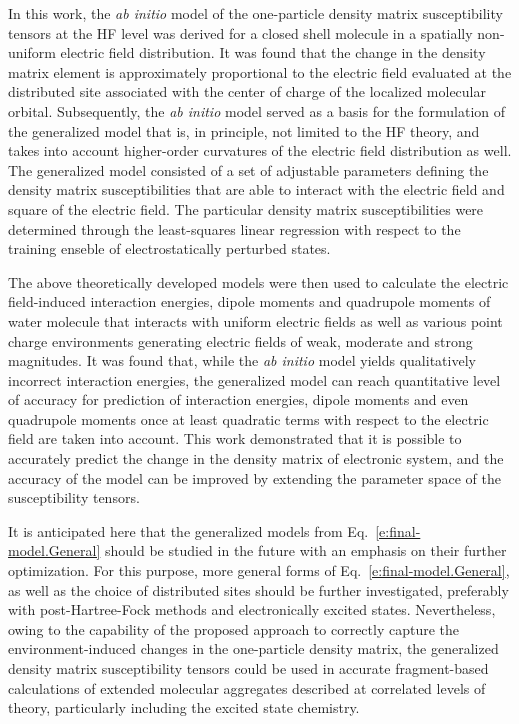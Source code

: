 \documentclass[aip,amsmath,amssymb,reprint,floatfix]{revtex4-1}
\begin{document}
In this work, the \emph{ab initio} model of the one\hyp{}particle density matrix susceptibility tensors
at the HF level was derived for a closed shell molecule in a spatially non\hyp{}uniform
electric field distribution. It was found that the change in the density matrix element
is approximately proportional to the electric field evaluated at the distributed site associated with the 
center of charge of the 
localized molecular orbital. Subsequently, the \emph{ab initio} model served as a basis
for the formulation of the generalized model that is, in principle, not limited to the HF theory,
and takes into account higher\hyp{}order curvatures of the electric field distribution as well.
The generalized model consisted of a set of adjustable parameters defining the density matrix susceptibilities
that are able to interact with the electric field and square of the electric field.
The particular density matrix susceptibilities were determined through the least\hyp{}squares 
linear regression with respect to the training enseble of electrostatically perturbed states.

The above theoretically developed models were then used to calculate the electric field\hyp{}induced
interaction energies, dipole moments and quadrupole moments of water molecule that
interacts with uniform electric fields as well as 
various point charge environments generating electric fields of weak, moderate
and strong magnitudes. It was found that, while the \emph{ab initio} model yields qualitatively incorrect
interaction energies, the generalized model can reach quantitative level of accuracy
for prediction of interaction energies, dipole moments and even quadrupole moments
once at least quadratic terms with respect to the electric field are taken into account. 
This work demonstrated that it is possible to
accurately predict the change in the density matrix of electronic system, and the accuracy of the model
can be improved by extending the parameter space of the susceptibility tensors. 

It is anticipated here that the generalized models from Eq.~\eqref{e:final-model.General}
should be studied in the future with an emphasis 
on their further optimization.
For this purpose, more general forms of Eq.~\eqref{e:final-model.General}, as well as the choice of distributed
sites should be further investigated, preferably with post\hyp{}Hartree\hyp{}Fock methods
and electronically excited states.
Nevertheless, owing to the capability of the proposed approach to correctly capture the 
environment\hyp{}induced changes in the one\hyp{}particle density matrix, 
the generalized density matrix susceptibility tensors 
could be used in accurate fragment\hyp{}based calculations of extended molecular aggregates
described at correlated levels of theory, particularly including the excited state chemistry.
\end{document}

